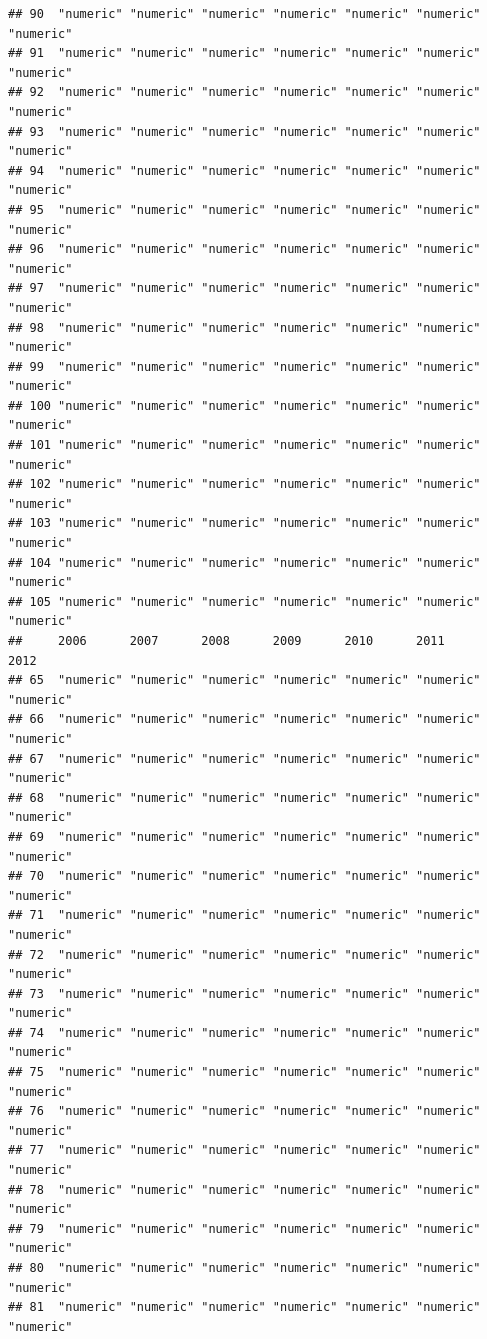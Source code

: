 \documentclass[
]{book}
\theoremstyle{definition}
\theoremstyle{definition}
\theoremstyle{definition}
\theoremstyle{definition}
\theoremstyle{remark}
\begin{document}
\begin{verbatim}
## 90  "numeric" "numeric" "numeric" "numeric" "numeric" "numeric" "numeric"
## 91  "numeric" "numeric" "numeric" "numeric" "numeric" "numeric" "numeric"
## 92  "numeric" "numeric" "numeric" "numeric" "numeric" "numeric" "numeric"
## 93  "numeric" "numeric" "numeric" "numeric" "numeric" "numeric" "numeric"
## 94  "numeric" "numeric" "numeric" "numeric" "numeric" "numeric" "numeric"
## 95  "numeric" "numeric" "numeric" "numeric" "numeric" "numeric" "numeric"
## 96  "numeric" "numeric" "numeric" "numeric" "numeric" "numeric" "numeric"
## 97  "numeric" "numeric" "numeric" "numeric" "numeric" "numeric" "numeric"
## 98  "numeric" "numeric" "numeric" "numeric" "numeric" "numeric" "numeric"
## 99  "numeric" "numeric" "numeric" "numeric" "numeric" "numeric" "numeric"
## 100 "numeric" "numeric" "numeric" "numeric" "numeric" "numeric" "numeric"
## 101 "numeric" "numeric" "numeric" "numeric" "numeric" "numeric" "numeric"
## 102 "numeric" "numeric" "numeric" "numeric" "numeric" "numeric" "numeric"
## 103 "numeric" "numeric" "numeric" "numeric" "numeric" "numeric" "numeric"
## 104 "numeric" "numeric" "numeric" "numeric" "numeric" "numeric" "numeric"
## 105 "numeric" "numeric" "numeric" "numeric" "numeric" "numeric" "numeric"
##     2006      2007      2008      2009      2010      2011      2012     
## 65  "numeric" "numeric" "numeric" "numeric" "numeric" "numeric" "numeric"
## 66  "numeric" "numeric" "numeric" "numeric" "numeric" "numeric" "numeric"
## 67  "numeric" "numeric" "numeric" "numeric" "numeric" "numeric" "numeric"
## 68  "numeric" "numeric" "numeric" "numeric" "numeric" "numeric" "numeric"
## 69  "numeric" "numeric" "numeric" "numeric" "numeric" "numeric" "numeric"
## 70  "numeric" "numeric" "numeric" "numeric" "numeric" "numeric" "numeric"
## 71  "numeric" "numeric" "numeric" "numeric" "numeric" "numeric" "numeric"
## 72  "numeric" "numeric" "numeric" "numeric" "numeric" "numeric" "numeric"
## 73  "numeric" "numeric" "numeric" "numeric" "numeric" "numeric" "numeric"
## 74  "numeric" "numeric" "numeric" "numeric" "numeric" "numeric" "numeric"
## 75  "numeric" "numeric" "numeric" "numeric" "numeric" "numeric" "numeric"
## 76  "numeric" "numeric" "numeric" "numeric" "numeric" "numeric" "numeric"
## 77  "numeric" "numeric" "numeric" "numeric" "numeric" "numeric" "numeric"
## 78  "numeric" "numeric" "numeric" "numeric" "numeric" "numeric" "numeric"
## 79  "numeric" "numeric" "numeric" "numeric" "numeric" "numeric" "numeric"
## 80  "numeric" "numeric" "numeric" "numeric" "numeric" "numeric" "numeric"
## 81  "numeric" "numeric" "numeric" "numeric" "numeric" "numeric" "numeric"

\end{verbatim}
\end{document}
